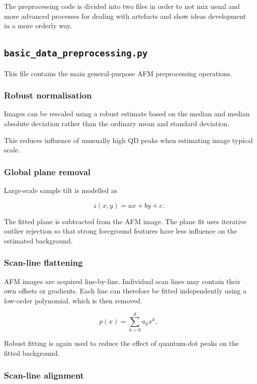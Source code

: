 \documentclass[11pt,a4paper]{article}
\begin{document}
The preprocessing code is divided into two files in order to not mix usual and more advanced processes for dealing with artefacts and show ideas development in a more orderly way.


\subsection{\texttt{basic\_data\_preprocessing.py}}

This file contains the main general-purpose AFM preprocessing operations.

\subsubsection{Robust normalisation}

Images can be rescaled using a robust estimate based on the median and median absolute deviation rather than the ordinary mean and standard deviation.

This reduces influence of unusually high QD peaks when estimating image typical scale.


\subsubsection{Global plane removal}

Large-scale sample tilt is modelled as

\[
z(x,y)=ax+by+c.
\]

The fitted plane is subtracted from the AFM image. The plane fit uses iterative outlier rejection so that strong foreground features have less influence on the estimated background.


\subsubsection{Scan-line flattening}

AFM images are acquired line-by-line. Individual scan lines may contain their own offsets or gradients. Each line can therefore be fitted independently using a low-order polynomial, which is then removed.

\[
p(x)=\sum_{k=0}^{d}a_kx^k,
\]

Robust fitting is again used to reduce the effect of quantum-dot peaks on the fitted background.


\subsubsection{Scan-line alignment}
\end{document}
